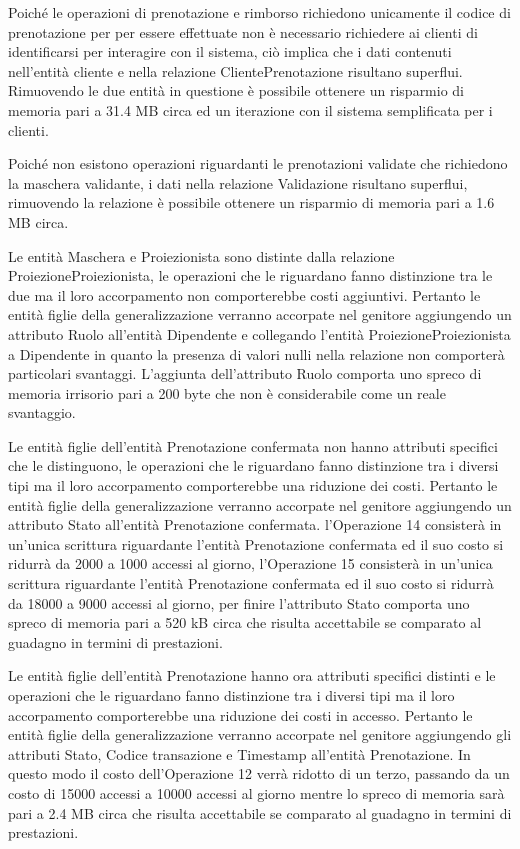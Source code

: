 Poiché le operazioni di prenotazione e rimborso richiedono unicamente il codice
di prenotazione per per essere effettuate non è necessario richiedere ai clienti
di identificarsi per interagire con il sistema, ciò implica che i dati
contenuti nell'entità cliente e nella relazione ClientePrenotazione risultano
superflui. Rimuovendo le due entità in questione è possibile ottenere un
risparmio di memoria pari a %
31.4 MB circa ed un iterazione con il sistema semplificata per i clienti.

Poiché non esistono operazioni riguardanti le prenotazioni validate che
richiedono la maschera validante, i dati nella relazione Validazione risultano
superflui, rimuovendo la relazione è possibile ottenere un risparmio di memoria
pari a %
1.6 MB circa.

Le entità Maschera e Proiezionista sono distinte dalla relazione
ProiezioneProiezionista, le operazioni che le riguardano fanno distinzione tra
le due ma il loro accorpamento non comporterebbe costi aggiuntivi.
Pertanto le entità figlie della generalizzazione verranno accorpate nel
genitore aggiungendo un attributo Ruolo all'entità Dipendente e collegando
l'entità ProiezioneProiezionista a Dipendente in quanto la presenza di valori
nulli nella relazione non comporterà particolari svantaggi.
L'aggiunta dell'attributo Ruolo comporta uno spreco di memoria irrisorio pari a
200 byte che non è considerabile come un reale svantaggio.


Le entità figlie dell'entità Prenotazione confermata non hanno attributi
specifici che le distinguono, le operazioni che le riguardano fanno distinzione 
tra i diversi tipi ma il loro accorpamento comporterebbe una riduzione dei
costi.
Pertanto le entità figlie della generalizzazione verranno accorpate nel
genitore aggiungendo un attributo Stato all'entità Prenotazione confermata.
l'Operazione 14 consisterà in un'unica scrittura riguardante
l'entità Prenotazione confermata ed il suo costo si ridurrà da 2000 a 1000
accessi al giorno,
l'Operazione 15 consisterà in un'unica scrittura riguardante
l'entità Prenotazione confermata ed il suo costo si ridurrà da 18000 a 9000
accessi al giorno,
per finire l'attributo Stato comporta uno spreco di memoria pari a
520 kB circa che risulta accettabile se comparato al guadagno in termini di
prestazioni.

Le entità figlie dell'entità Prenotazione hanno ora attributi specifici 
distinti e le operazioni che le riguardano fanno distinzione tra i diversi
tipi ma il loro accorpamento comporterebbe una riduzione dei costi in accesso.
Pertanto le entità figlie della generalizzazione verranno accorpate nel
genitore aggiungendo gli attributi Stato, Codice transazione e Timestamp
all'entità Prenotazione.
In questo modo il costo dell'Operazione 12 verrà ridotto di un terzo,
passando da un costo di 15000 accessi a 10000 accessi al giorno mentre
lo spreco di memoria sarà pari a
2.4 MB circa che risulta accettabile se comparato al guadagno in termini di
prestazioni.

